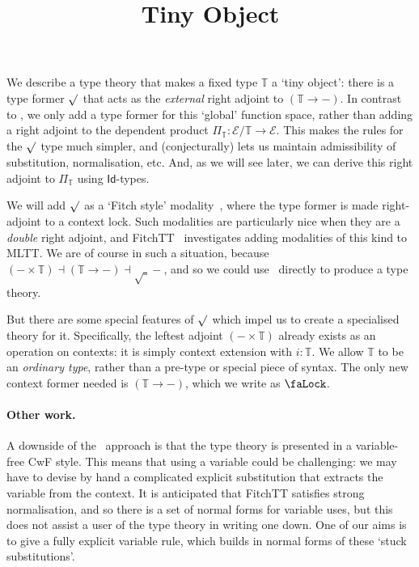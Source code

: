 \documentclass[10pt]{article}
\title{Tiny Object}
\author{}
\date{}
\theoremstyle{definition}
\newcommand{\Idsym}{\mathsf{Id}}
\newcommand{\lock}{\text{\faLock}}
\newcommand{\Tiny}{\mathbb{T}}
\newcommand{\lockn}[1]{\mathcal{#1}}
\newcommand{\rform}[2]{\surd_{\lockn{#1}} #2}
\begin{document}
\maketitle

We describe a type theory that makes a fixed type $\Tiny$ a `tiny object': there is a type former $\rform{}$ that acts as the \emph{external} right adjoint to $(\Tiny \to -)$. In contrast to \cite[Section 2]{transpension}, we only add a type former for this `global' function space, rather than adding a right adjoint to the dependent product $\Pi_\Tiny : \mathcal{E}/\Tiny \to \mathcal{E}$. This makes the rules for the $\rform{}$ type much simpler, and (conjecturally) lets us maintain admissibility of substitution, normalisation, etc. And, as we will see later, we can derive this right adjoint to $\Pi_\Tiny$ using $\Idsym$-types.

We will add $\rform{}$ as a `Fitch style' modality~\cite{clouston:fitch-style}, where the type former is made right-adjoint to a context lock. Such modalities are particularly nice when they are a \emph{double} right adjoint, and FitchTT~\cite{fitchtt} investigates adding modalities of this kind to MLTT. We are of course in such a situation, because $(- \times \Tiny) \dashv (\Tiny \to -) \dashv \rform{} -$, and so we could use~\cite{fitchtt} directly to produce a type theory. 

But there are some special features of $\rform{}$ which impel us to create a specialised theory for it. Specifically, the leftest adjoint $(- \times \Tiny)$ already exists as an operation on contexts: it is simply context extension with $i : \Tiny$. We allow $\Tiny$ to be an \emph{ordinary type}, rather than a pre-type or special piece of syntax. The only new context former needed is $(\Tiny \to -)$, which we write as $\lock$. 

\paragraph{Other work.}

A downside of the~\cite{fitchtt} approach is that the type theory is presented in a variable-free CwF style. This means that using a variable could be challenging: we may have to devise by hand a complicated explicit substitution that extracts the variable from the context. It is anticipated that FitchTT satisfies strong normalisation, and so there is a set of normal forms for variable uses, but this does not assist a user of the type theory in writing one down.  One of our aims is to give a fully explicit variable rule, which builds in normal forms of these `stuck substitutions'.
\end{document}
